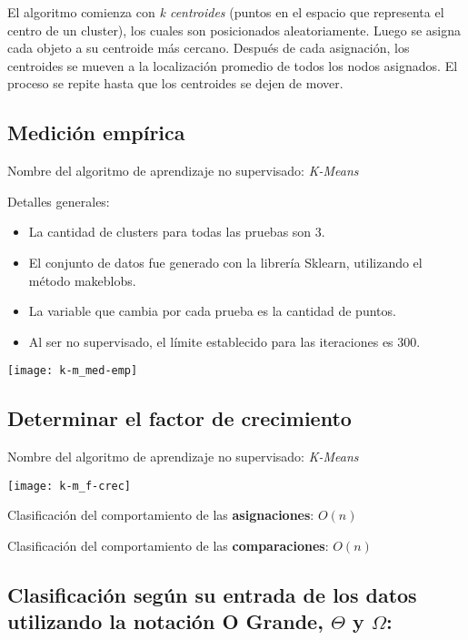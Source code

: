 \documentclass{article}
\begin{document}
El algoritmo comienza con \textit{k centroides} (puntos en el espacio que representa el centro de un cluster), los cuales son posicionados aleatoriamente. Luego se asigna cada objeto a su centroide más cercano. Después de cada asignación, los centroides se mueven a la localización promedio de todos los nodos asignados. El proceso se repite hasta que los centroides se dejen de mover. \textcite{oreillyML}

\subsection{Medición empírica}
Nombre del algoritmo de aprendizaje no supervisado: \textit{K-Means}

Detalles generales:

\begin{itemize}
  \item La cantidad de clusters para todas las pruebas son 3.
  \item El conjunto de datos fue generado con la librería Sklearn, utilizando el método make\textunderscore{}blobs.
  \item La variable que cambia por cada prueba es la cantidad de puntos.
  \item Al ser no supervisado, el límite establecido para las iteraciones es 300.
\end{itemize}

\begin{center}
  \texttt{[image: k-m\_med-emp]}
\end{center}
\newpage
\subsection{Determinar el factor de crecimiento}
Nombre del algoritmo de aprendizaje no supervisado: \textit{K-Means}

\begin{center}
  \texttt{[image: k-m\_f-crec]}
\end{center}

Clasificación del comportamiento de las \textbf{asignaciones}: \(O(n)\)

Clasificación del comportamiento de las \textbf{comparaciones}: \(O(n)\)

\subsection{Clasificación según su entrada de los datos utilizando la notación O Grande, \(\Theta\) y \(\Omega\):}
\end{document}
